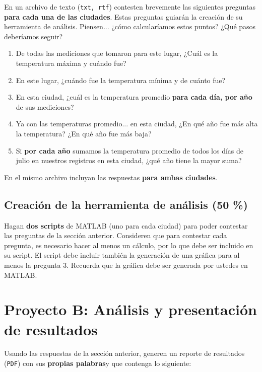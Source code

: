 \documentclass[]{article}
\theoremstyle{definition}
\begin{document}
En un archivo de texto (\texttt{txt, rtf}) contesten brevemente las siguientes preguntas \textbf{para cada una de las ciudades}.
Estas preguntas guiarán la creación de su herramienta de análisis. Piensen... ¿cómo calcularíamos estos puntos? ¿Qué pasos deberíamos seguir?

\begin{enumerate}
    \item De todas las mediciones que tomaron para este lugar, ¿Cuál es la temperatura máxima y cuándo fue?
    \item En este lugar, ¿cuándo fue la temperatura mínima y de cuánto fue?
    \item En esta ciudad, ¿cuál es la temperatura promedio \textbf{para cada día, por año} de sus mediciones?
    \item Ya con las temperaturas promedio... en esta ciudad, ¿En qué año fue más alta la temperatura? ¿En qué año fue más baja?
    \item Si \textbf{por cada año} sumamos la temperatura promedio de todos los días de julio en nuestros registros en esta ciudad, ¿qué año tiene la mayor suma?
\end{enumerate}

En el mismo archivo incluyan las respuestas \textbf{para ambas ciudades}.

\subsection{Creación de la herramienta de análisis (50 \%)}

Hagan \textbf{dos scripts} de MATLAB (uno para cada ciudad) para poder contestar las preguntas de la sección anterior.
Consideren que para contestar cada pregunta, es necesario hacer al menos un cálculo, por lo que debe ser incluido en su script.
El script debe incluir también la generación de una gráfica para al menos la pregunta 3.
Recuerda que la gráfica debe ser generada por ustedes en MATLAB.

\section{Proyecto B: Análisis y presentación de resultados}

Usando las respuestas de la sección anterior, generen un reporte de resultados (\texttt{PDF}) con sus \textbf{propias palabras}y que contenga lo siguiente:

\bigskip
\end{document}
